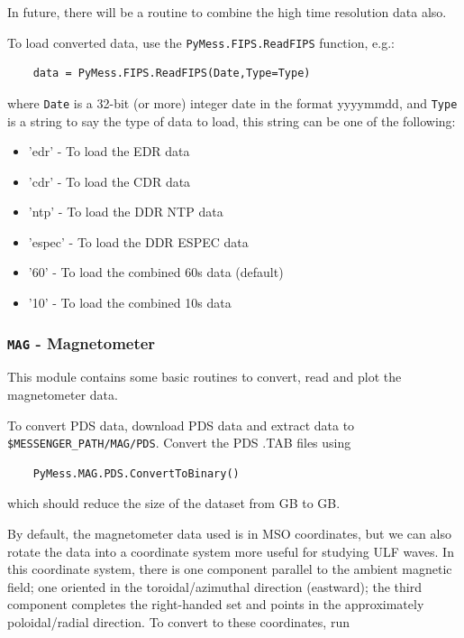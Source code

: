 	In future, there will be a routine to combine the high time resolution 
	data also.
	
	To load converted data, use the \texttt{PyMess.FIPS.ReadFIPS} 
	function, e.g.:
	
	\begin{verbatim}
	data = PyMess.FIPS.ReadFIPS(Date,Type=Type)
	\end{verbatim}
	
	where \texttt{Date} is a 32-bit (or more) integer date in the format yyyymmdd,
	and \texttt{Type} is a string to say the type of data to load, this string can
	be one of the following:
		
		\begin{itemize}
			\item 'edr' - To load the EDR data
			\item 'cdr' - To load the CDR data
			\item 'ntp' - To load the DDR NTP data
			\item 'espec' - To load the DDR ESPEC data
			\item '60' - To load the combined 60s data (default)
			\item '10' - To load the combined 10s data
		\end{itemize}
	
	\subsubsection{\texttt{MAG} - Magnetometer}
	
	This module contains some basic routines to convert, read and plot the
	magnetometer data.
	
	To convert PDS data, download PDS data and extract data to \texttt{\$MESSENGER\_PATH/MAG/PDS}.
	Convert the PDS .TAB files using
	
	\begin{verbatim}
	PyMess.MAG.PDS.ConvertToBinary()
	\end{verbatim}
	
	which should reduce the size of the dataset from GB to GB.
	
	By default, the magnetometer data used is in MSO coordinates, but we can
	also rotate the data into a coordinate system more useful for studying 
	ULF waves. In this coordinate system, there is one component parallel to 
	the ambient magnetic field; one oriented in the toroidal/azimuthal 
	direction (eastward); the third component completes the right-handed set 
	and points in the approximately poloidal/radial direction. To convert to
	these coordinates, run
	
